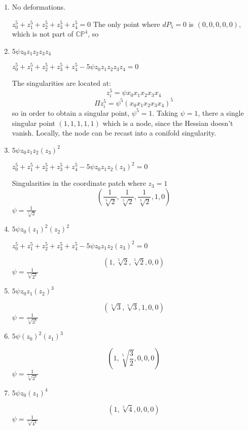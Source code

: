 \begin{enumerate}
  \item No deformations.

    $z_0^5+z_1^5+z_2^5+z_3^5+z_4^5=0$ The only point where $dP_5=0$ is  $(0,0,0,0,0)$, which 
    is not part of $\mathbb{CP}^4$, so 

  \item $5\psi z_0z_1z_2z_3z_4$

    $z_0^5+z_1^5+z_2^5+z_3^5+z_4^5- 5\psi z_0z_1z_2z_3z_4=0$

    The singularities are located at:
    \begin{equation}
      z_i^5=\psi x_0x_1x_2x_3x_4
    \end{equation}
    \begin{equation}
      \Pi z_i^5=\psi^5 ( x_0x_1x_2x_3x_4 )^5
    \end{equation}
    so in order to obtain a singular point, $\psi^5=1$.
    Taking $\psi=1$, there a single singular point $(1,1,1,1,1)$ which is a node, since the Hessian doesn't vanish.
    Locally, the node can be recast into a conifold singularity.

  \item $5\psi z_0z_1z_2(z_3)^2$

    $z_0^5+z_1^5+z_2^5+z_3^5+z_4^5- 5\psi z_0z_1z_2(z_3)^2=0$

    Singularities in the coordinate patch where $z_3=1$
    \begin{equation}
      (\frac{1}{\sqrt[5]{2}}, \frac{1}{\sqrt[5]{2}}, \frac{1}{\sqrt[5]{2}}, 1,0) 
    \end{equation}
    $\psi=\frac{1}{\sqrt[5]{2}}$

  \item $5\psi z_0(z_1)^2(z_2)^2$

    $z_0^5+z_1^5+z_2^5+z_3^5+z_4^5- 5\psi z_0z_1z_2(z_3)^2=0$

    \begin{equation}
      (1, \sqrt[5]{2}, \sqrt[5]{2}, 0, 0)
    \end{equation}
    $\psi=\frac{1}{\sqrt[5]{2^4}}$

  \item $5\psi z_0z_1(z_2)^3$

    \begin{equation}
      (\sqrt[5]{3}, \sqrt[5]{3},1, 0, 0)
    \end{equation}
    $\psi=\frac{1}{\sqrt[5]{3^3}}$

  \item $5\psi (z_0)^2(z_1)^3$

    \begin{equation}
      (1, \sqrt[5]{\frac{3}{2}}, 0, 0, 0)
    \end{equation}
    $\psi=\frac{1}{\sqrt[5]{3^3}}$

  \item $5\psi z_0(z_1)^4$

    \begin{equation}
      (1, \sqrt[5]{4}, 0, 0, 0)
    \end{equation}
    $\psi=\frac{1}{\sqrt[5]{4^4}}$

\end{enumerate}

